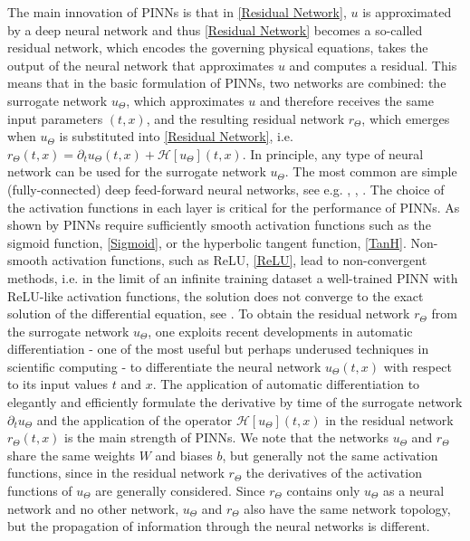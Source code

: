 The main innovation of PINNs is that in \cref{Residual Network}, $u$ is approximated by a deep neural network and thus \cref{Residual Network} becomes a so-called residual network, which encodes the governing physical equations, takes the output of the neural network that approximates $u$ and computes a residual. This means that in the basic formulation of PINNs, two networks are combined: the surrogate network $u_\Theta$, which approximates $u$ and therefore receives the same input parameters $(t,x)$, and the resulting residual network $r_\Theta$, which emerges when $u_\Theta$ is substituted into \cref{Residual Network}, i.e. $r_\Theta(t,x) = \partial_t u_\Theta (t,x) + \mathcal{H} \left[ u_\Theta \right] (t, x)$. In principle, any type of neural network can be used for the surrogate network $u_\Theta$. The most common are simple (fully-connected) deep feed-forward neural networks, see e.g. \cite{RaissiPerdikarisKarniadakis:2019}, \cite{BlechschmidtErnst:2021}, \cite{Markidis:2021}. The choice of the activation functions in each layer is critical for the performance of PINNs. As shown by \cite{MishraMolinaro:2021} PINNs require sufficiently smooth activation functions such as the sigmoid function, \cref{Sigmoid}, or the hyperbolic tangent function, \cref{TanH}. Non-smooth activation functions, such as ReLU, \cref{ReLU}, lead to non-convergent methods, i.e. in the limit of an infinite training dataset a well-trained PINN with ReLU-like activation functions, the solution does not converge to the exact solution of the differential equation, see \cite{MishraMolinaro:2021}. To obtain the residual network $r_\Theta$ from the surrogate network $u_\Theta$, one exploits recent developments in automatic differentiation - one of the most useful but perhaps underused techniques in scientific computing - to differentiate the neural network $u_\Theta(t,x)$ with respect to its input values $t$ and $x$. The application of automatic differentiation to elegantly and efficiently formulate the derivative by time of the surrogate network $\partial_t u_\Theta$ and the application of the operator $\mathcal{H} \left[ u_\Theta \right] (t,x)$ in the residual network $r_\Theta(t,x)$ is the main strength of PINNs. We note that the networks $u_\Theta$ and $r_\Theta$ share the same weights $W$ and biases $b$, but generally not the same activation functions, since in the residual network $r_\Theta$ the derivatives of the activation functions of $u_\Theta$ are generally considered. Since $r_\Theta$ contains only $u_\Theta$ as a neural network and no other network, $u_\Theta$ and $r_\Theta$ also have the same network topology, but the propagation of information through the neural networks is different. \\

